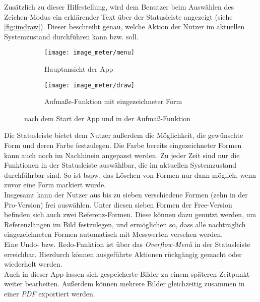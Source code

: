 Zusätzlich zu dieser Hilfestellung, wird dem Benutzer beim Auswählen des Zeichen-Modus ein erklärender Text über der Statusleiste angezeigt (siehe \autoref{fig:imdraw}).
Dieser beschreibt genau, welche Aktion der Nutzer im aktuellen Systemzustand durchführen kann bzw. soll. \\

\begin{figure}[h]
  \centering
  \begin{subfigure}[t]{0.4\textwidth}
    \texttt{[image: image\_meter/menu]}
    \caption{Hauptansicht der App}
    \label{fig:immenu}	
  \end{subfigure}
  \begin{subfigure}[t]{0.4\textwidth}
    \texttt{[image: image\_meter/draw]}
    \caption{Aufmaße-Funktion mit eingezeichneter Form} 
    \label{fig:imdraw}	
  \end{subfigure}
  \caption{\im{} nach dem Start der App und in der Aufmaß-Funktion}
\end{figure}

\noindent
Die Statusleiste bietet dem Nutzer außerdem die Möglichkeit, die gewünschte Form und deren Farbe festzulegen.
Die Farbe bereits eingezeichneter Formen kann auch noch im Nachhinein angepasst werden.
Zu jeder Zeit sind nur die Funktionen in der Statusleiste auswählbar, die im aktuellen Systemzustand durchführbar sind.
So ist bspw. das Löschen von Formen nur dann möglich, wenn zuvor eine Form markiert wurde. \\

Insgesamt kann der Nutzer aus bis zu sieben verschiedene Formen (zehn in der Pro-Version) frei auswählen.
Unter diesen sieben Formen der Free-Version befinden sich auch zwei Referenz-Formen.
Diese können dazu genutzt werden, um Referenzlängen im Bild festzulegen, und ermöglichen so, dass alle nachträglich eingezeichneten Formen automatisch mit Messwerten versehen werden. \\

Eine Undo- bzw. Redo-Funktion ist über das \emph{Overflow-Menü} in der Statusleiste erreichbar.
Hierdurch können ausgeführte Aktionen rückgängig gemacht oder wiederholt werden. \\

Auch in dieser App lassen sich gespeicherte Bilder zu einem späteren Zeitpunkt weiter bearbeiten.
Außerdem können mehrere Bilder gleichzeitig zusammen in einer \emph{PDF} exportiert werden.

